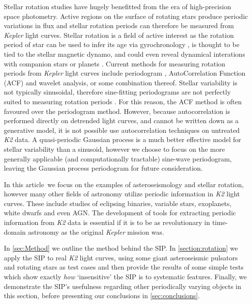 \documentclass[useAMS, usenatbib, preprint, 12pt]{aastex}
\newcommand{\article}{article}
\begin{document}
Stellar rotation studies have hugely benefitted from the era of high-precision
space photometry.
Active regions on the surface of rotating stars produce periodic variations
in flux and stellar rotation periods can therefore be measured from
{\it Kepler} light curves.
Stellar rotation is a field of active interest as the rotation period of star
can be used to infer its age via gyrochronology
\citep{Skumanich1972, Barnes2007, Epstein2014, Angus2015}, is thought to be
tied to the stellar magnetic dynamo, and could even reveal dynamical
interations with companion stars or planets
\citep[e.g.][]{Beky2014, Poppenhaeger2014}.
Current methods for measuring rotation periods from {\it Kepler} light curves
include periodogram \citep[e.g.][]{Reinhold2013}, AutoCorrelation Function
(ACF) \citep{McQuillan2013} and wavelet \citep[e.g.][]{Garcia2014} analysis,
or some combination thereof.
Stellar variability is not typically sinusoidal, therefore sine-fitting
periodograms are not perfectly suited to measuring rotation periods
\citep{McQuillan2013}.
For this reason, the ACF method is often favoured over the periodogram method.
However, because autocorrelation is performed directly on detrended light
curves, and cannot be written down as a generative model, it is not possible
use autocorrelation techniques on untreated {\it K2} data.
A quasi-periodic Gaussian process is a much better effective model for stellar
variability than a sinusoid, however we choose to focus on the more generally
applicable (and computationally tractable) sine-wave periodogram, leaving the
Gaussian process periodogram for future consideration.

In this \article\ we focus on the examples of asteroseismology and stellar
rotation, however many other fields of astronomy utilize periodic information
in {\it K2} light curves.
These include studies of eclipsing binaries, variable stars, exoplanets, white
dwarfs and even AGN.
The development of tools for extracting periodic information from {\it K2}
data is essential if it is to be as revolutionary in time-domain
astronomy as the original {\it Kepler} mission was.

In \textsection\ref{sec:Method} we outline the method behind the SIP.
In \textsection\ref{section:rotation} we apply the SIP to real {\it K2} light
curves, using some giant asteroseismic pulsators and rotating stars as test
cases and then provide the results of some simple tests which show exactly
{\it how} `insensitive' the SIP is to systematic features.
Finally, we demonstrate the SIP's usefulness regarding other periodically
varying objects in this section, before presenting our conclusions in
\textsection\ref{sec:conclusions}.
\end{document}

